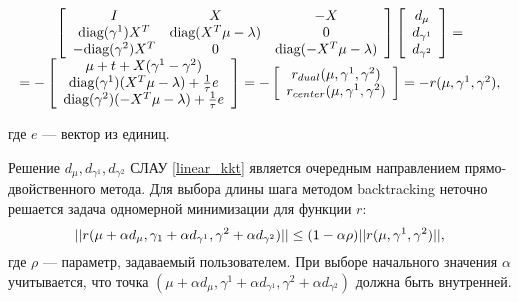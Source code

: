 \documentclass[12pt]{article}
\begin{document}
		\begin{equation}\label{linear_kkt}
		\begin{array}[c]{c}
			\left [
			\begin{array}[c]{ccc}
				I & X & -X \\
				\mbox{diag}(\gamma^1) X^T & \mbox{diag}(X^T \mu - \lambda)& 0\\
				-\mbox{diag}(\gamma^2) X^T & 0 & \mbox{diag}(-X^T \mu - \lambda) 
			\end{array}
			\right ]
			\left [
			\begin{array}[c]{c}
				d_\mu\\
				d_{\gamma^1}\\
				d_{\gamma^2}
			\end{array}
			\right ] 
			=
		\\
			= -\left [
			\begin{array}{c}
				\mu + t + X (\gamma^1 - \gamma^2)\\
				\mbox{diag}(\gamma^1) (X^T \mu - \lambda) + \frac 1 \tau e\\
				\mbox{diag}(\gamma^2) (-X^T \mu - \lambda) + \frac 1 \tau e
			\end{array}
			\right ] =
			-\left [
			\begin{array}{c}
				r_{dual}(\mu, \gamma^1, \gamma^2)\\
				r_{center}(\mu, \gamma^1, \gamma^2)
			\end{array}
			\right ] 
			
			 = -r(\mu, \gamma^1, \gamma^2),
		\end{array}
		\end{equation}
		
		где $e$ — вектор из единиц. 
		
		Решение $d_\mu, d_{\gamma^1}, d_{\gamma^2}$ СЛАУ \ref{linear_kkt} является очередным направлением прямо-двойственного метода. Для выбора длины шага методом backtracking неточно решается задача одномерной минимизации для функции $r$:
		$$||r(\mu + \alpha d_\mu, \gamma_1 + \alpha d_{\gamma^1}, \gamma^2 + \alpha d_{\gamma^2})|| \le 
		(1 - \alpha \rho) ||r(\mu, \gamma^1, \gamma^2)||,$$
		где $\rho$ — параметр, задаваемый пользователем. При выборе начального значения $\alpha$ учитывается, что точка $(\mu + \alpha d_\mu, \gamma^1 + \alpha d_{\gamma^1}, \gamma^2 + \alpha d_{\gamma^2})$  должна быть внутренней.
	
\end{document}
